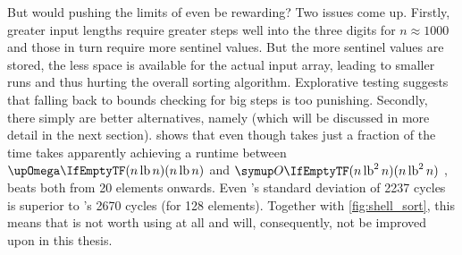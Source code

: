But would pushing the limits of \ShS{} even be rewarding?
Two issues come up.
Firstly, greater input lengths require greater steps \Dash well into the three digits for \(n \approx 1000\) \cite{skean2023optimization, 10.1007/3-540-44669-9_12} \Dash and those in turn require more sentinel values.
But the more sentinel values are stored, the less space is available for the actual input array, leading to smaller runs and thus hurting the overall sorting algorithm.
Explorative testing suggests that falling back to bounds checking for big steps is too punishing.
Secondly, there simply are better alternatives, namely \QS{} (which will be discussed in more detail in the next section).
 shows that even though \ShS{} takes just a fraction of the time \IS{} takes \Dash apparently achieving a runtime between \(\bigomega{n \lb n}\) and \(\bigoh{n \lb^2 n}\) \Dash\negthinspace, \QS{} beats both from 20 elements onwards.
Even \QS{}'s standard deviation of 2237 cycles is superior to \ShS{}'s 2670 cycles (for 128 elements).
Together with \cref{fig:shell_sort}, this means that \ShS{} is not worth using at all and will, consequently, not be improved upon in this thesis.
